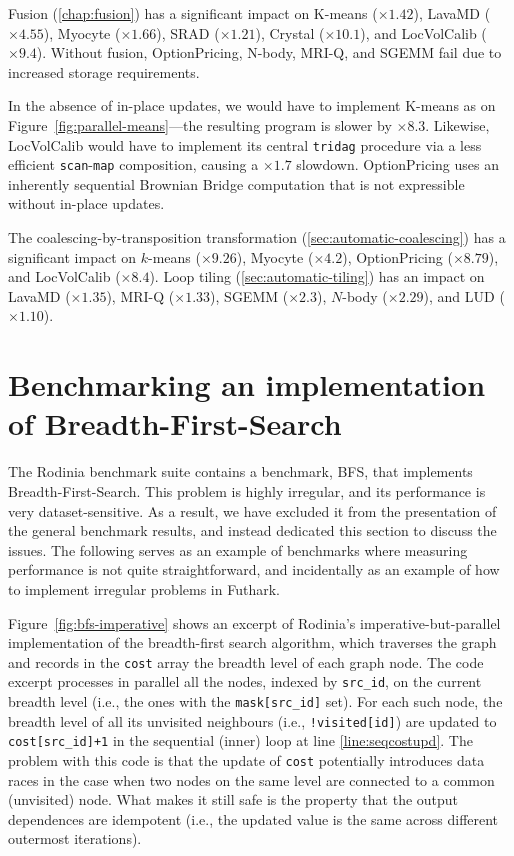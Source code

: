 Fusion (\cref{chap:fusion}) has a significant impact on K-means
($\times1.42$), LavaMD ($\times4.55$), Myocyte ($\times1.66$), SRAD
($\times1.21$), Crystal ($\times10.1$), and LocVolCalib ($\times9.4$).
Without fusion, OptionPricing, N-body, MRI-Q, and SGEMM fail due to
increased storage requirements.

In the absence of in-place updates, we would have to implement K-means
as on Figure~\ref{fig:parallel-means}---the resulting program is
slower by $\times8.3$.  Likewise, LocVolCalib would have to implement
its central \lstinline{tridag} procedure via a less efficient
\lstinline{scan}-\lstinline{map} composition, causing a $\times1.7$
slowdown.  OptionPricing uses an inherently sequential Brownian Bridge
computation that is not expressible without in-place updates.

The coalescing-by-transposition transformation
(\cref{sec:automatic-coalescing}) has a significant impact on
$k$-means ($\times9.26$), Myocyte ($\times4.2$), OptionPricing
($\times 8.79$), and LocVolCalib ($\times 8.4$).
%
Loop tiling (\cref{sec:automatic-tiling}) has an impact on LavaMD
($\times 1.35$), MRI-Q ($\times1.33$), SGEMM ($\times2.3$), $N$-body
($\times 2.29$), and LUD ($\times 1.10$).

\section{Benchmarking an implementation of Breadth-First-Search}
\label{sec:bfs-benchmarking}

The Rodinia benchmark suite contains a benchmark, BFS, that
implements Breadth-First-Search.  This problem is highly irregular,
and its performance is very dataset-sensitive.  As a result, we have
excluded it from the presentation of the general benchmark results,
and instead dedicated this section to discuss the issues.  The
following serves as an example of benchmarks where measuring
performance is not quite straightforward, and incidentally as an
example of how to implement irregular problems in Futhark.

Figure~\ref{fig:bfs-imperative} shows an excerpt of Rodinia's
imperative-but-parallel implementation of the breadth-first search
algorithm, which traverses the graph and records in the
\lstinline{cost} array the breadth level of each graph node.
%
The code excerpt processes in parallel all the nodes, indexed by \lstinline{src_id},
on the current breadth level (i.e., the ones with the \lstinline{mask[src_id]} set).
%
For each such node, the breadth level of all its unvisited neighbours
(i.e., \lstinline{!visited[id]}) are updated to \lstinline{cost[src_id]+1} in the
sequential (inner) loop at line \ref{line:seqcostupd}.
%
The problem with this code is that the update of \lstinline{cost}
potentially introduces data races in the case when two nodes on the
same level are connected to a common (unvisited) node.  What makes it
still safe is the property that the output dependences are idempotent
(i.e., the updated value is the same across different outermost
iterations).

